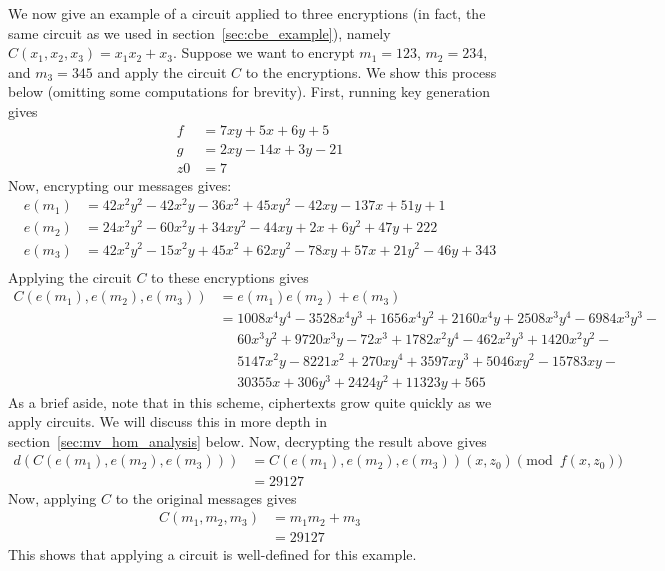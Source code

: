 \documentclass[11pt]{report}
\begin{document}
We now give an example of a circuit applied to three encryptions (in fact, the same circuit as we used in section~\ref{sec:cbe_example}), namely $C(x_1,x_2,x_3)=x_1x_2+x_3$. Suppose we want to encrypt $m_1=123$, $m_2=234$, and $m_3=345$ and apply the circuit $C$ to the encryptions. We show this process below (omitting some computations for brevity). First, running key generation gives
\begin{align*}
f &= 7xy+5x+6y+5\\
g &= 2xy-14x+3y-21\\
z0 &= 7
\end{align*}
Now, encrypting our messages gives:
\begin{align*}
e(m_1) &= 42x^2y^2-42x^2y-36x^2+45xy^2-42xy-137x+51y+1\\
e(m_2) &= 24x^2y^2-60x^2y+34xy^2- 44xy+2x+6y^2+47y+222\\
e(m_3) &= 42x^2y^2-15x^2y+45x^2+62xy^2-78xy+57x+21y^2-46y+343\\
\end{align*}
Applying the circuit $C$ to these encryptions gives
\begin{align*}
C(e(m_1),e(m_2),e(m_3)) &= e(m_1)e(m_2)+e(m_3)\\
&= 1008x^4y^4-3528x^4y^3+1656x^4y^2+2160x^4y+2508x^3y^4-6984x^3y^3-\\
& \ \ \ \ \ \ 60x^3y^2+9720x^3y-72x^3+1782x^2y^4-462x^2y^3+1420x^2y^2-\\
& \ \ \ \ \ \ 5147x^2y-8221x^2+270xy^4+3597xy^3+5046xy^2-15783xy-\\
& \ \ \ \ \ \ 30355x+306y^3+2424y^2+11323y+565
\end{align*}
As a brief aside, note that in this scheme, ciphertexts grow quite quickly as we apply circuits. We will discuss this in more depth in section~\ref{sec:mv_hom_analysis} below. Now, decrypting the result above gives
\begin{align*}
d(C(e(m_1),e(m_2),e(m_3))) &= C(e(m_1),e(m_2),e(m_3))(x,z_0) \pmod{f(x,z_0)}\\
&= 29127
\end{align*}
Now, applying $C$ to the original messages gives
\begin{align*}
C(m_1,m_2,m_3) &= m_1m_2+m_3\\
&= 29127
\end{align*}
This shows that applying a circuit is well-defined for this example.
\end{document}
